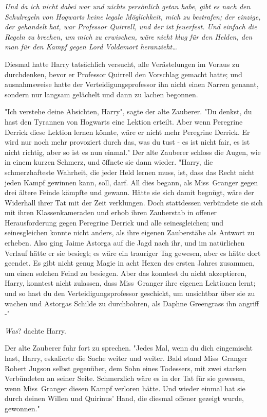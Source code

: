 {\emph{Und da ich nicht dabei war und nichts persönlich getan habe, gibt es nach den Schulregeln von Hogwarts keine legale Möglichkeit, mich zu bestrafen; der einzige, der gehandelt hat, war Professor Quirrell, und der ist feuerfest. Und einfach die Regeln zu brechen, um mich zu erwischen, wäre nicht klug für den Helden, den man für den Kampf gegen Lord Voldemort heranzieht…}

Diesmal hatte Harry tatsächlich versucht, alle Verästelungen im Voraus zu durchdenken, bevor er Professor Quirrell den Vorschlag gemacht hatte; und ausnahmsweise hatte der Verteidigungsprofessor ihn nicht einen Narren genannt, sondern nur langsam gelächelt und dann zu lachen begonnen.

"Ich verstehe deine Absichten, Harry", sagte der alte Zauberer. "Du denkst, du hast den Tyrannen von Hogwarts eine Lektion erteilt. Aber wenn Peregrine Derrick diese Lektion lernen könnte, wäre er nicht mehr Peregrine Derrick. Er wird nur noch mehr provoziert durch das, was du tust - es ist nicht fair, es ist nicht richtig, aber so ist es nun einmal." Der alte Zauberer schloss die Augen, wie in einem kurzen Schmerz, und öffnete sie dann wieder. "Harry, die schmerzhafteste Wahrheit, die jeder Held lernen muss, ist, dass das Recht nicht jeden Kampf gewinnen kann, soll, darf. All dies begann, als Miss~Granger gegen drei ältere Feinde kämpfte und gewann. Hätte sie sich damit begnügt, wäre der Widerhall ihrer Tat mit der Zeit verklungen. Doch stattdessen verbündete sie sich mit ihren Klassenkameraden und erhob ihren Zauberstab in offener Herausforderung gegen Peregrine Derrick und alle seinesgleichen; und seinesgleichen konnte nicht anders, als ihre eigenen Zauberstäbe als Antwort zu erheben. Also ging Jaime Astorga auf die Jagd nach ihr, und im natürlichen Verlauf hätte er sie besiegt; es wäre ein trauriger Tag gewesen, aber es hätte dort geendet. Es gibt nicht genug Magie in acht Hexen des ersten Jahres zusammen, um einen solchen Feind zu besiegen. Aber das konntest du nicht akzeptieren, Harry, konntest nicht zulassen, dass Miss~Granger ihre eigenen Lektionen lernt; und so hast du den Verteidigungsprofessor geschickt, um unsichtbar über sie zu wachen und Astorgas Schilde zu durchbohren, als Daphne Greengrass ihn angriff -"

\emph{Was}? dachte Harry.

Der alte Zauberer fuhr fort zu sprechen. "Jedes Mal, wenn du dich eingemischt hast, Harry, eskalierte die Sache weiter und weiter. Bald stand Miss~Granger Robert Jugson selbst gegenüber, dem Sohn eines Todessers, mit zwei starken Verbündeten an seiner Seite. Schmerzlich wäre es in der Tat für sie gewesen, wenn Miss~Granger diesen Kampf verloren hätte. Und wieder einmal hat sie durch deinen Willen und Quirinus' Hand, die diesmal offener gezeigt wurde, gewonnen."

}
